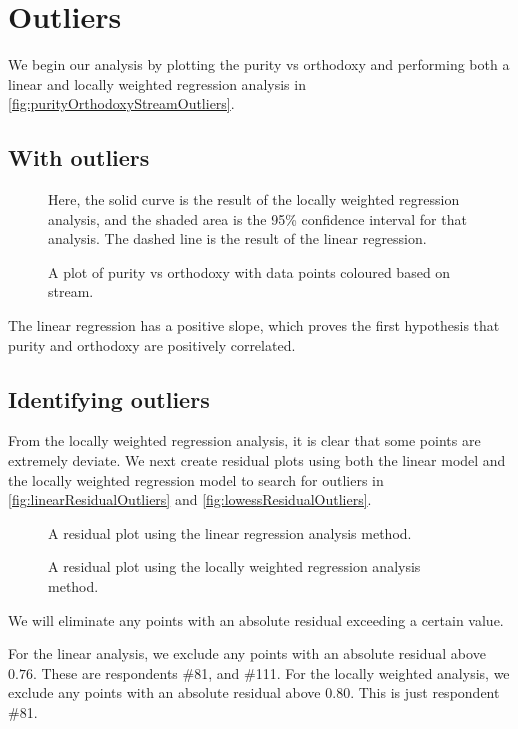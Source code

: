 \chapter{Outliers}

We begin our analysis by plotting the purity vs orthodoxy and performing both a linear and locally weighted regression analysis in \vref{fig:purityOrthodoxyStreamOutliers}.

\section{With outliers}
\begin{figure}[H]
	\caption{A plot of purity vs orthodoxy with data points coloured based on stream.}
	\label{fig:purityOrthodoxyStreamOutliers}
	Here, the solid curve is the result of the locally weighted regression analysis, and the shaded area is the 95\% confidence interval for that analysis.
	The dashed line is the result of the linear regression.
\end{figure}

The linear regression has a positive slope, which proves the first hypothesis that purity and orthodoxy are positively correlated.

\section{Identifying outliers}
From the locally weighted regression analysis, it is clear that some points are extremely deviate.
We next create residual plots using both the linear model and the locally weighted regression model to search for outliers in \vref{fig:linearResidualOutliers} and \vref{fig:lowessResidualOutliers}.

\begin{figure}[H]
	\caption{A residual plot using the linear regression analysis method.}
	\label{fig:linearResidualOutliers}
\end{figure}

\begin{figure}[H]
	\caption{A residual plot using the locally weighted regression analysis method.}
	\label{fig:lowessResidualOutliers}
\end{figure}

We will eliminate any points with an absolute residual exceeding a certain value.

For the linear analysis, we exclude any points with an absolute residual above $0.76$.
These are respondents \#81, and \#111.
For the locally weighted analysis, we exclude any points with an absolute residual above $0.80$.
This is just respondent \#81.

